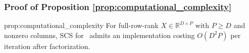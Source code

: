 

\subsubsection{Proof of Proposition \ref{prop:computational_complexity}}
\label{proof:computational_complexity}

\begin{restatedproposition}{prop:computational_complexity}
For full-row-rank $X\in\mathbb R^{D\times P}$ with $P\geq D$ and nonzero columns, SCS for \isometrypursuit~admits an implementation costing $O(D^2P)$ per iteration after factorization.
\end{restatedproposition}

